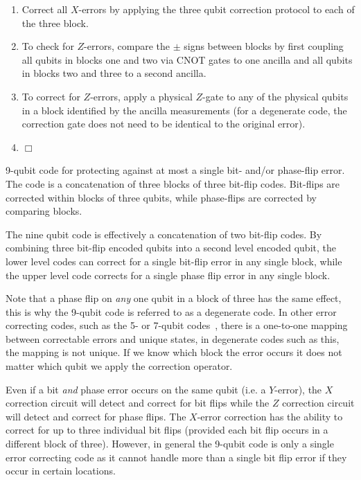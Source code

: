 \begin{table}[!htbp]
\begin{mdframed}[innertopmargin=3pt, innerbottommargin=3pt, nobreak]
{\begin{enumerate}
\begin{align}
&= \frac{\alpha}{\sqrt{8}}(\ket{000}+\ket{111})(\ket{000}+\ket{111})(\ket{000}-\ket{111}) \nonumber \\
& + \frac{\beta}{\sqrt{8}}(\ket{000}-\ket{111})(\ket{000}-\ket{111})(\ket{000}+\ket{111}).\nonumber
\end{align}
\item Correct all $X$-errors by applying the three qubit correction protocol to each of the three block.
\item To check for $Z$-errors, compare the $\pm$ signs between blocks by first coupling all qubits in 
blocks one and two via CNOT gates to one ancilla and all qubits in blocks two and three to a second ancilla.
\item To correct for $Z$-errors, apply a physical $Z$-gate to any of the physical qubits in a block identified by the 
ancilla measurements (for a degenerate code, the correction gate does not need to be identical to the original error).
\item $\Box$
\end{enumerate}}
\end{mdframed}
\captionspacealg \caption{9-qubit code for protecting against at most a single bit- and/or phase-flip error. The code is a concatenation of three blocks of three bit-flip codes. Bit-flips are corrected within blocks of three qubits, while phase-flips are corrected by comparing blocks.} \label{alg:nine_QEC}
\end{table}

The nine qubit code is effectively a concatenation of two bit-flip codes. By combining three bit-flip encoded qubits into a 
second level encoded qubit, the lower level codes can correct for a single bit-flip error in any single block, while the 
upper level code corrects for a single phase flip error in any single block. 

Note that a phase flip on {\em any} one qubit in a block of three has the same effect, this is why the 9-qubit 
code is referred to as a degenerate code.  In other error correcting codes, such as the 5- or 7-qubit codes~\cite{bib:S96,bib:LMPZ96}, there is a one-to-one 
mapping between correctable errors and unique states, in degenerate codes such as this, the mapping is not unique.  If we know which block the error occurs it does not matter which qubit we apply the correction operator.  

Even if a bit {\em and} phase error occurs on the same qubit (i.e. a $Y$-error), the $X$ correction circuit will detect and correct for 
bit flips while the $Z$ correction circuit will detect and correct for phase flips.  The $X$-error correction 
has the ability to correct for up to three individual bit flips (provided each bit flip occurs in a different block of three).  However, in general 
the 9-qubit code is only a single error correcting code as it cannot handle more than a single bit flip error if they occur in certain locations.

